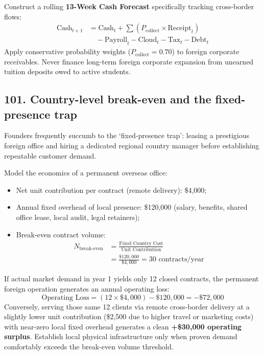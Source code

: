 Construct a rolling \textbf{13-Week Cash Forecast} specifically tracking cross-border flows:
\begin{equation}
\begin{aligned}
\text{Cash}_{t+1} &= \text{Cash}_t + \sum \left(P_{\text{collect}} \times \text{Receipt}_t\right) \\
&\quad - \text{Payroll}_t - \text{Cloud}_t - \text{Tax}_t - \text{Debt}_t
\end{aligned}
\end{equation}
Apply conservative probability weights ($P_{\text{collect}} = 0.70$) to foreign corporate receivables. Never finance long-term foreign corporate expansion from unearned tuition deposits owed to active students.

\subsection{101. Country-level break-even and the fixed-presence trap}

Founders frequently succumb to the `fixed-presence trap': leasing a prestigious foreign office and hiring a dedicated regional country manager before establishing repeatable customer demand.

Model the economics of a permanent overseas office:
\begin{itemize}
    \item Net unit contribution per contract (remote delivery): \$4,000;
    \item Annual fixed overhead of local presence: \$120,000 (salary, benefits, shared office lease, local audit, legal retainers);
    \item Break-even contract volume:
    \begin{equation}
    \begin{aligned}
    N_{\text{break-even}} &= \frac{\text{Fixed Country Cost}}{\text{Unit Contribution}} \\
    &= \frac{\$120,000}{\$4,000} = 30 \text{ contracts/year}
    \end{aligned}
    \end{equation}
\end{itemize}
If actual market demand in year 1 yields only 12 closed contracts, the permanent foreign operation generates an annual operating loss:
\begin{equation}
\text{Operating Loss} = (12 \times \$4,000) - \$120,000 = -\$72,000
\end{equation}
Conversely, serving those same 12 clients via remote cross-border delivery at a slightly lower unit contribution (\$2,500 due to higher travel or marketing costs) with near-zero local fixed overhead generates a clean \textbf{+\$30,000 operating surplus}. Establish local physical infrastructure only when proven demand comfortably exceeds the break-even volume threshold.

